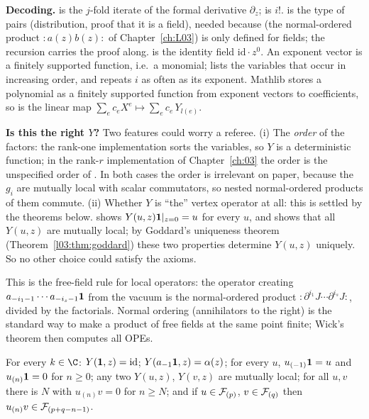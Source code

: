\begin{dictionary}
\textbf{Decoding.}  is the $j$-fold iterate of the formal derivative $\partial_z$;
 is $i!$.  is the type of pairs (distribution, proof that it
is a field), needed because  (the normal-ordered product ${:}a(z)b(z){:}$ of
Chapter~\ref{ch:L03}) is only defined for fields; the recursion carries the
proof along.  is the identity field $\mathrm{id}\cdot z^0$. An exponent vector
 is a finitely supported function, i.e.\ a monomial;  lists
the variables that occur in increasing order, and  repeats $i$ as often as its
exponent. Mathlib stores a polynomial as a finitely supported function from exponent vectors to
coefficients, so  is the linear map
$\sum_ec_eX^e\mapsto\sum_ec_e\,Y_{l(e)}$.

\textbf{Is this the right $Y$?} Two features could worry a referee. (i) The \emph{order} of the factors:
the rank-one implementation sorts the variables, so $Y$ is a deterministic function; in the rank-$r$
implementation of Chapter~\ref{ch:03} the order is the unspecified order of . In both
cases the order is irrelevant on paper, because the $g_i$ are mutually local with scalar commutators, so
nested normal-ordered products of them commute. (ii) Whether $Y$ is ``the'' vertex operator at all: this is
settled by the theorems below.  shows $Y(u,z)\mathbf{1}|_{z=0}=u$ for every $u$, and
 shows that all $Y(u,z)$ are mutually local; by Goddard's uniqueness theorem
(Theorem~\ref{l03:thm:goddard}) these two properties determine $Y(u,z)$ uniquely. So no other choice
could satisfy the axioms.
\end{dictionary}

\begin{physics}
This is the free-field rule for local operators: the operator creating $a_{-i_1-1}\cdots a_{-i_s-1}\mathbf{1}$
from the vacuum is the normal-ordered product ${:}\partial^{i_1}J\cdots\partial^{i_s}J{:}$, divided by the
factorials. Normal ordering (annihilators to the right) is the standard way to make a product of free
fields at the same point finite; Wick's theorem then computes all OPEs.
\end{physics}

\begin{theorem}\label{l05:thm:VAaxioms}
For every $k\in\C$: $Y(\mathbf{1},z)=\mathrm{id}$; $Y(a_{-1}\mathbf{1},z)=\alpha(z)$; for every $u$,
$u_{(-1)}\mathbf{1}=u$ and $u_{(n)}\mathbf{1}=0$ for $n\ge0$; any two $Y(u,z)$, $Y(v,z)$ are mutually local;
for all $u,v$ there is $N$ with $u_{(n)}v=0$ for $n\ge N$; and if $u\in\mathcal{F}_{(p)}$, $v\in\mathcal{F}_{(q)}$
then $u_{(n)}v\in\mathcal{F}_{(p+q-n-1)}$.
\end{theorem}

